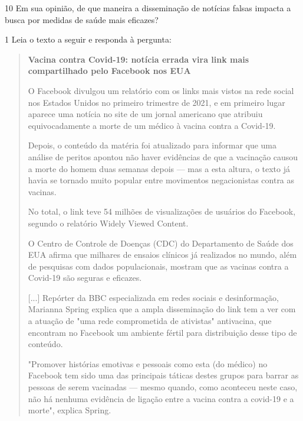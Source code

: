 \num{10} Em sua opinião, de que maneira a disseminação de notícias falsas
impacta a busca por medidas de saúde mais eficazes?



\num{1} Leia o texto a seguir e responda à pergunta:

\begin{quote}
\textbf{Vacina contra Covid-19: notícia errada vira link mais
compartilhado pelo Facebook nos EUA}

O Facebook divulgou um relatório com os links mais vistos na rede social
nos Estados Unidos no primeiro trimestre de 2021, e em primeiro lugar
aparece uma notícia no site de um jornal americano que atribuiu
equivocadamente a morte de um médico à vacina contra a Covid-19.

Depois, o conteúdo da matéria foi atualizado para informar que uma
análise de peritos apontou não haver evidências de que a vacinação
causou a morte do homem duas semanas depois --- mas a esta altura, o
texto já havia se tornado muito popular entre movimentos negacionistas
contra as vacinas.

No total, o link teve 54 milhões de visualizações de usuários do
Facebook, segundo o relatório Widely Viewed Content.

O Centro de Controle de Doenças (CDC) do Departamento de Saúde dos EUA
afirma que milhares de ensaios clínicos já realizados no mundo, além de
pesquisas com dados populacionais, mostram que as vacinas contra a
Covid-19 são seguras e eficazes.

{[}...{]} Repórter da BBC especializada em redes sociais e
desinformação, Marianna Spring explica que a ampla disseminação do link
tem a ver com a atuação de "uma rede comprometida de ativistas"
antivacina, que encontram no Facebook um ambiente fértil para
distribuição desse tipo de conteúdo.

"Promover histórias emotivas e pessoais como esta (do médico) no
Facebook tem sido uma das principais táticas destes grupos para barrar
as pessoas de serem vacinadas --- mesmo quando, como aconteceu neste
caso, não há nenhuma evidência de ligação entre a vacina contra a
covid-19 e a morte", explica Spring.

\end{quote}

